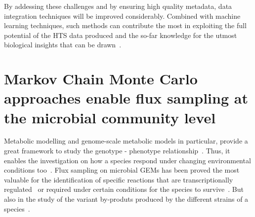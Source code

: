       By addessing these challenges and by ensuring high quality metadata,
      data integration techniques will be improved considerably. 
      Combined with machine learning techniques, such methods 
      can contribute the most in exploiting the
      full potential of the HTS data produced
      and the so-far knowledge
      for the utmost biological insights that can be drawn~\citep{noor2019biological}.

\section{Markov Chain Monte Carlo approaches enable flux sampling at the microbial community level}
\label{concl:fluxes}

   Metabolic modelling and genome-scale metabolic models in particular, 
   provide a great framework to study the genotype - phenotype relationship~\citep{lewis2012constraining}.
   Thus, it enables the investigation on how a species respond under changing environmental conditions 
   too~\citep{herrmann2019flux}. 
   Flux sampling on microbial GEMs has been proved the most valuable for 
   the identification of specific reactions that are transcriptionally regulated~\citep{Bordel10}
   or required under certain conditions for the species to survive~\citep{herrmann2019flux}.
   But also in the study of the variant by-produts produced by the different strains of a 
   species~\citep{scott2021metabolic}.

